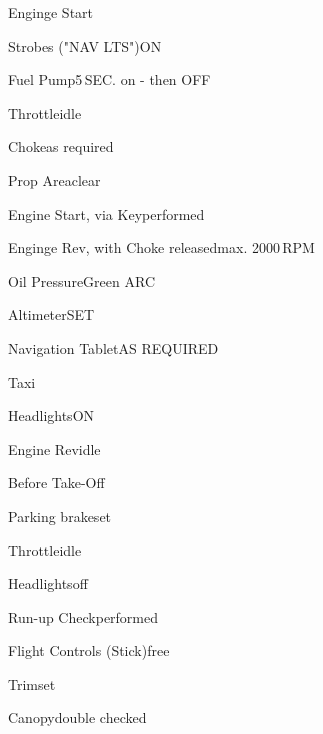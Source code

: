 \begin{checklist}{Enginge Start}
	\item{Strobes ("NAV LTS")}{ON}
	\item{Fuel Pump}{5\,SEC. on - then OFF}
	\item{Throttle}{idle}
	\item{Choke}{as required}
	\item{Prop Area}{clear}
	\item{Engine Start, via Key}{performed}
	\item{Enginge Rev, with Choke released}{max. 2000\,RPM}
	\item{Oil Pressure}{Green ARC}
	\item{Altimeter}{SET}
	\item{Navigation Tablet}{AS REQUIRED}
\end{checklist}

\begin{checklist}{Taxi}
	\item{Headlights}{ON}
	\item{Engine Rev}{idle}
\end{checklist}

\begin{checklist}{Before Take-Off}
	\item{Parking brake}{set}
	\item{Throttle}{idle}
	\item{Headlights}{off}
	\item{Run-up Check}{performed}
	\item{Flight Controls (Stick)}{free}
	\item{Trim}{set}
	\item{Canopy}{double checked}
\end{checklist}

